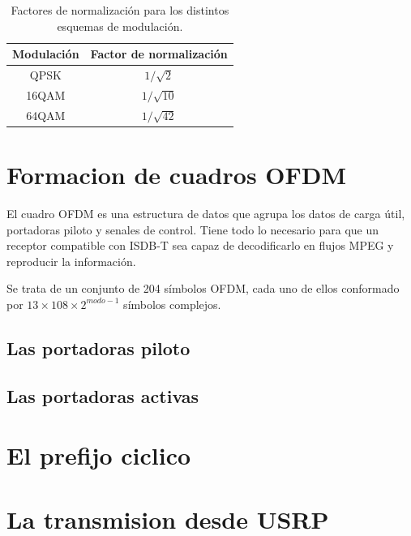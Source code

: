 \begin{table}[h!]
\centering
\begin{tabular}{|c|c|}
\hline
\textbf{Modulaci\'on} 				& \textbf{Factor de normalizaci\'on}\\
\hline
QPSK 		& $1/ \sqrt{2}$\\
\hline
16QAM		& $1/ \sqrt{10}$ \\
\hline
64QAM 		& $1/ \sqrt{42}$ \\
\hline
\end{tabular}
\caption{\label{t:factor_normalizacion} Factores de normalizaci\'on para los distintos esquemas de modulaci\'on.}
\end{table}


\section{Formacion de cuadros OFDM}
El cuadro OFDM es una estructura de datos que agrupa los datos de carga \'util, portadoras piloto y senales de control. Tiene todo lo necesario para que un receptor compatible con ISDB-T sea capaz de decodificarlo en flujos MPEG y reproducir la informaci\'on.

Se trata de un conjunto de 204 s\'imbolos OFDM, cada uno de ellos conformado por $13 \times 108 \times 2^{modo -1}$ s\'imbolos complejos. 







	\subsection{Las portadoras piloto}
	\subsection{Las portadoras activas}
\section{El prefijo ciclico}
\section{La transmision desde USRP}